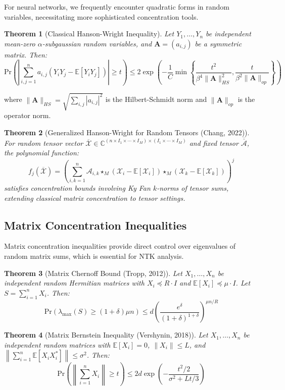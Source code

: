 \documentclass{article}
\newtheorem{theorem}{Theorem}[section]
\newcommand{\E}{\mathbb{E}}
\newcommand{\C}{\mathbb{C}}
\newcommand{\Pr}{\text{Pr}}
\begin{document}
For neural networks, we frequently encounter quadratic forms in random variables, necessitating more sophisticated concentration tools.

\begin{theorem}[Classical Hanson-Wright Inequality]
Let $Y_1, \ldots, Y_n$ be independent mean-zero $\alpha$-subgaussian random variables, and $\mathbf{A} = (a_{i,j})$ be a symmetric matrix. Then:
$$\Pr\left(\left|\sum_{i,j=1}^n a_{i,j}(Y_i Y_j - \E[Y_i Y_j])\right| \geq t\right) \leq 2\exp\left(-\frac{1}{C}\min\left\{\frac{t^2}{\beta^4\|\mathbf{A}\|_{HS}^2}, \frac{t}{\beta^2\|\mathbf{A}\|_{op}}\right\}\right)$$
\end{theorem}

where $\|\mathbf{A}\|_{HS} = \sqrt{\sum_{i,j} |a_{i,j}|^2}$ is the Hilbert-Schmidt norm and $\|\mathbf{A}\|_{op}$ is the operator norm.

\begin{theorem}[Generalized Hanson-Wright for Random Tensors (Chang, 2022)]
For random tensor vector $\overline{\mathcal{X}} \in \C^{(n \times I_1 \times \cdots \times I_M) \times (I_1 \times \cdots \times I_M)}$ and fixed tensor $\overline{\overline{\mathcal{A}}}$, the polynomial function:
$$f_j(\overline{\mathcal{X}}) = \left(\sum_{i,k=1}^n \mathcal{A}_{i,k} \star_M (\mathcal{X}_i - \E[\mathcal{X}_i]) \star_M (\mathcal{X}_k - \E[\mathcal{X}_k])\right)^j$$
satisfies concentration bounds involving Ky Fan $k$-norms of tensor sums, extending classical matrix concentration to tensor settings.
\end{theorem}

\subsection{Matrix Concentration Inequalities}

Matrix concentration inequalities provide direct control over eigenvalues of random matrix sums, which is essential for NTK analysis.

\begin{theorem}[Matrix Chernoff Bound (Tropp, 2012)]
Let $X_1, \ldots, X_n$ be independent random Hermitian matrices with $X_i \preceq R \cdot I$ and $\E[X_i] \preceq \mu \cdot I$. Let $S = \sum_{i=1}^n X_i$. Then:
$$\Pr(\lambda_{\max}(S) \geq (1+\delta)\mu n) \leq d \left(\frac{e^\delta}{(1+\delta)^{1+\delta}}\right)^{\mu n / R}$$
\end{theorem}

\begin{theorem}[Matrix Bernstein Inequality (Vershynin, 2018)]
Let $X_1, \ldots, X_n$ be independent random matrices with $\E[X_i] = 0$, $\|X_i\| \leq L$, and $\left\|\sum_{i=1}^n \E[X_i X_i^*]\right\| \leq \sigma^2$. Then:
$$\Pr\left(\left\|\sum_{i=1}^n X_i\right\| \geq t\right) \leq 2d \exp\left(-\frac{t^2/2}{\sigma^2 + Lt/3}\right)$$
\end{theorem}
\end{document}
